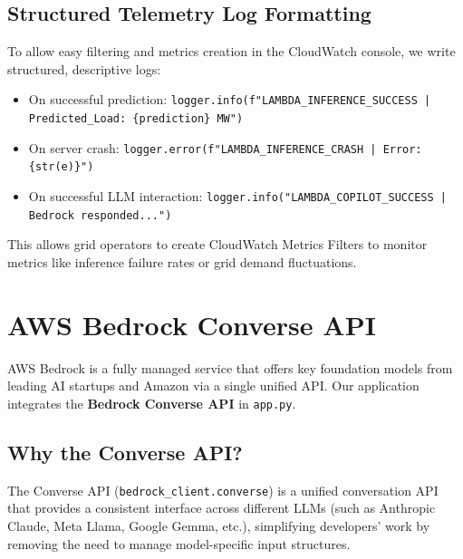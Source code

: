 \documentclass[11pt,a4paper]{article}
\begin{document}
\subsection{Structured Telemetry Log Formatting}
To allow easy filtering and metrics creation in the CloudWatch console, we write structured, descriptive logs:
\begin{itemize}
    \item On successful prediction: \texttt{logger.info(f"LAMBDA\_INFERENCE\_SUCCESS | Predicted\_Load: \{prediction\} MW")}
    \item On server crash: \texttt{logger.error(f"LAMBDA\_INFERENCE\_CRASH | Error: \{str(e)\}")}
    \item On successful LLM interaction: \texttt{logger.info("LAMBDA\_COPILOT\_SUCCESS | Bedrock responded...")}
\end{itemize}
This allows grid operators to create CloudWatch Metrics Filters to monitor metrics like inference failure rates or grid demand fluctuations.

\section{AWS Bedrock Converse API}
AWS Bedrock is a fully managed service that offers key foundation models from leading AI startups and Amazon via a single unified API. Our application integrates the \textbf{Bedrock Converse API} in \texttt{app.py}.

\subsection{Why the Converse API?}
The Converse API (\texttt{bedrock\_client.converse}) is a unified conversation API that provides a consistent interface across different LLMs (such as Anthropic Claude, Meta Llama, Google Gemma, etc.), simplifying developers' work by removing the need to manage model-specific input structures.
\end{document}

